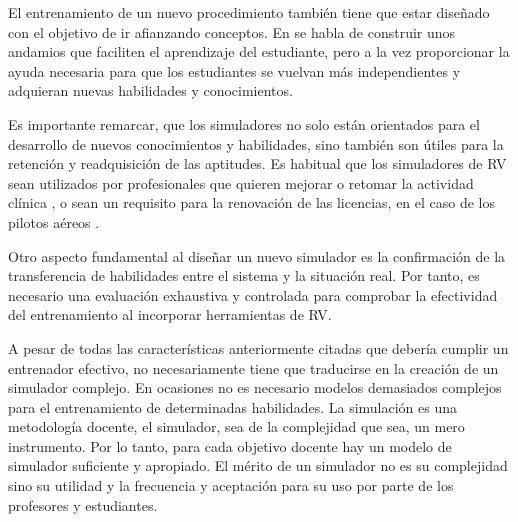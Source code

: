 El entrenamiento de un nuevo procedimiento también tiene que estar diseñado con el objetivo de ir afianzando conceptos. En \cite{olson2014jerome} se habla de construir unos andamios que faciliten el aprendizaje del estudiante, pero a la vez proporcionar la ayuda necesaria para que los estudiantes se vuelvan más independientes y adquieran nuevas habilidades y conocimientos.


Es importante remarcar, que los simuladores no solo están orientados para el desarrollo de nuevos conocimientos y habilidades, sino también son útiles para la retención y readquisición de las aptitudes. Es habitual que los simuladores de \ac{RV} sean utilizados por profesionales que quieren mejorar o retomar la actividad clínica \cite{Atesok}, o sean un requisito para la renovación de las licencias, en el caso de los pilotos aéreos \cite{normativa}. 


Otro aspecto fundamental al diseñar un nuevo simulador es la confirmación de la transferencia de habilidades entre el sistema y la situación real. Por tanto, es necesario una evaluación exhaustiva y controlada para comprobar la efectividad del entrenamiento al incorporar herramientas de \ac{RV}\cite{AIM2016224}.

A pesar de todas las características anteriormente citadas que debería cumplir un entrenador efectivo, no necesariamente tiene que traducirse en la creación de un simulador complejo. En ocasiones no es necesario modelos demasiados complejos para el entrenamiento de determinadas habilidades. La simulación es una metodología docente, el simulador, sea de la complejidad que sea, un mero instrumento. Por lo tanto, para cada objetivo docente hay un modelo de simulador suficiente y apropiado. El mérito de un simulador no es su complejidad sino su utilidad y la frecuencia y aceptación para su uso por parte de los profesores y estudiantes. %

